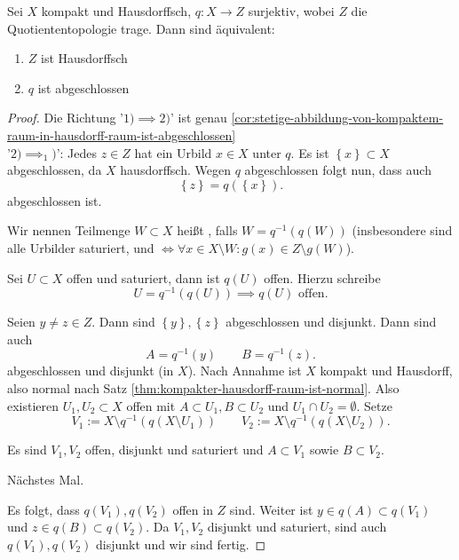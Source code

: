 \begin{theorem}\label{thm:quotientenraum-von-hausdorffraum-ist-hausdorff-gdw-projektion-abgeschlossen}
    Sei $X$ kompakt und Hausdorffsch, $q: X \to  Z$ surjektiv, wobei  $Z$ die Quotiententopologie trage. Dann sind äquivalent: 
    \begin{enumerate}[1)]
        \item $Z$ ist Hausdorffsch
        \item  $q$ ist abgeschlossen
    \end{enumerate}
\end{theorem}
\begin{proof}
    Die Richtung '$1) \implies 2)$' ist genau \autoref{cor:stetige-abbildung-von-kompaktem-raum-in-hausdorff-raum-ist-abgeschlossen} \\
    '$2)\implies_1)$': Jedes $z\in Z$ hat ein Urbild $x\in X$ unter $q$. Es ist  $\left \{x\right\} \subset X$ abgeschlossen, da $X$ hausdorffsch. Wegen  $q$ abgeschlossen folgt nun, dass auch
    \[
        \left \{z\right\}  = q(\left \{x\right\} )
    .\] 
    abgeschlossen ist. \\
    \begin{ddefinition}\label{def:saturierte-menge}
    Wir nennen Teilmenge $W\subset X$ heißt , falls $W = q^{-1}(q(W))$ (insbesondere sind alle Urbilder saturiert, und $\iff  \forall x\in X \setminus W : g(x) \in Z \setminus g(W)$).
    \end{ddefinition}
\begin{remark}
    Sei $U\subset X$ offen und saturiert, dann ist $q(U)$ offen. Hierzu schreibe
    \[
        U = q^{-1}(q(U)) \implies q(U) \text{ offen}
    .\] 
\end{remark}
Seien $y\neq z\in Z$. Dann sind $\left \{y\right\} ,\left \{z\right\} $ abgeschlossen und disjunkt. Dann sind auch
\[
    A = q^{-1}(y) \qquad B = q^{-1}(z)
.\] 
abgeschlossen und disjunkt (in  $X$). Nach Annahme ist  $X$ kompakt und Hausdorff, also normal nach Satz \ref{thm:kompakter-hausdorff-raum-ist-normal}. Also existieren  $U_1,U_2\subset X$ offen mit $A\subset U_1,B\subset U_2$ und $U_1 \cap U_2 = \emptyset$. Setze
\[
    V_1 := X \setminus q^{-1}(q(X\setminus U_1)) \qquad V_2 := X \setminus q^{-1}(q(X\setminus U_2))
.\] 
\begin{claim}
    Es sind $V_1,V_2$ offen, disjunkt und saturiert und $A\subset V_1$ sowie $B\subset V_2$.
\end{claim}
\begin{subproof}
    Nächstes Mal.
\end{subproof}
Es folgt, dass $q(V_1),q(V_2)$ offen in $Z$ sind. Weiter ist  $y\in q(A)\subset q(V_1)$ und $z\in q(B) \subset q(V_2)$. Da $V_1,V_2$ disjunkt und saturiert, sind auch $q(V_1),q(V_2)$ disjunkt und wir sind fertig.
\end{proof}
